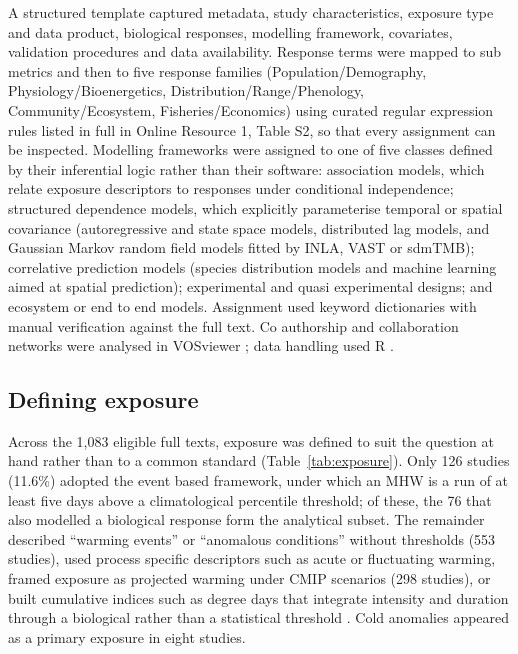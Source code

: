 A structured template captured metadata, study characteristics, exposure type and data product, biological responses, modelling framework, covariates, validation procedures and data availability. Response terms were mapped to sub metrics and then to five response families (Population\slash Demography, Physiology\slash Bioenergetics, Distribution\slash Range\slash Phenology, Community\slash Ecosystem, Fisheries\slash Economics) using curated regular expression rules listed in full in Online Resource 1, Table S2, so that every assignment can be inspected. Modelling frameworks were assigned to one of five classes defined by their inferential logic rather than their software: association models, which relate exposure descriptors to responses under conditional independence; structured dependence models, which explicitly parameterise temporal or spatial covariance (autoregressive and state space models, distributed lag models, and Gaussian Markov random field models fitted by INLA, VAST or sdmTMB); correlative prediction models (species distribution models and machine learning aimed at spatial prediction); experimental and quasi experimental designs; and ecosystem or end to end models. Assignment used keyword dictionaries with manual verification against the full text. Co authorship and collaboration networks were analysed in VOSviewer \citep{vaneck2010}; data handling used R \citep{rcore2024}.

\subsection{Defining exposure}\label{sec:exposure}

Across the 1,083 eligible full texts, exposure was defined to suit the question at hand rather than to a common standard (Table~\ref{tab:exposure}). Only 126 studies (11.6\%) adopted the event based \citet{hobday2016} framework, under which an MHW is a run of at least five days above a climatological percentile threshold; of these, the 76 that also modelled a biological response form the analytical subset. The remainder described ``warming events'' or ``anomalous conditions'' without thresholds (553 studies), used process specific descriptors such as acute or fluctuating warming, framed exposure as projected warming under CMIP scenarios (298 studies), or built cumulative indices such as degree days that integrate intensity and duration through a biological rather than a statistical threshold \citep[e.g.][]{brown2021}. Cold anomalies appeared as a primary exposure in eight studies.

